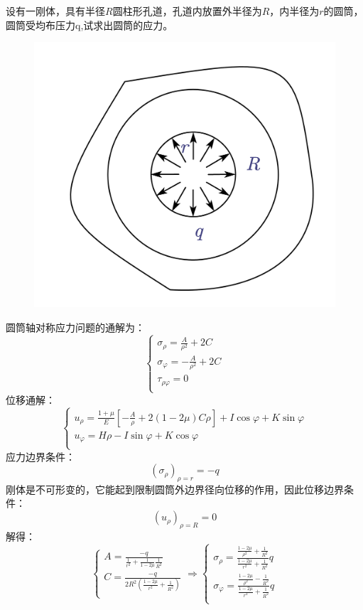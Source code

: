 \begin{example}
设有一刚体，具有半径$R$圆柱形孔道，孔道内放置外半径为$R$，内半径为$r$的圆筒，圆筒受均布压力q,试求出圆筒的应力。
\end{example}
\begin{figure}[!h]
	\centering
	\includegraphics[scale=0.5]{figure/4-8.png}
\end{figure}
	\begin{remark}
		圆筒轴对称应力问题的通解为：
		\[\begin{cases}
		\sigma _{\rho}=\frac{A}{\rho ^2}+2C\\
		\sigma _{\varphi}=-\frac{A}{\rho ^2}+2C\\
		\tau _{\rho \varphi}=0\\
		\end{cases}\]
		位移通解：\[\begin{cases}
		u_{\rho}=\frac{1+\mu}{E}\left[ -\frac{A}{\rho}+2\left( 1-2\mu \right) C\rho \right] +I\cos \varphi +K\sin \varphi\\
		u_{\varphi}=H\rho -I\sin \varphi +K\cos \varphi\\
		\end{cases}\]
		应力边界条件：\[\left( \sigma _{\rho} \right) _{\rho =r}=-q\]
		刚体是不可形变的，它能起到限制圆筒外边界径向位移的作用，因此位移边界条件：\[\left( u_{\rho} \right) _{\rho =R}=0\]
		解得：\[\begin{cases}
		A=\frac{-q}{\frac{1}{r^2}+\frac{1}{1-2\mu}\frac{1}{R^2}}\\
		C=\frac{-q}{2R^2\left( \frac{1-2\mu}{r^2}+\frac{1}{R^2} \right)}\\
		\end{cases}\Longrightarrow \begin{cases}
		\sigma _{\rho}=\frac{\frac{1-2\mu}{\rho ^2}+\frac{1}{R^2}}{\frac{1-2\mu}{r^2}+\frac{1}{R^2}}q\\
		\sigma _{\varphi}=\frac{\frac{1-2\mu}{\rho ^2}-\frac{1}{R^2}}{\frac{1-2\mu}{r^2}+\frac{1}{R^2}}q\\
		\end{cases}\]
	\end{remark}
